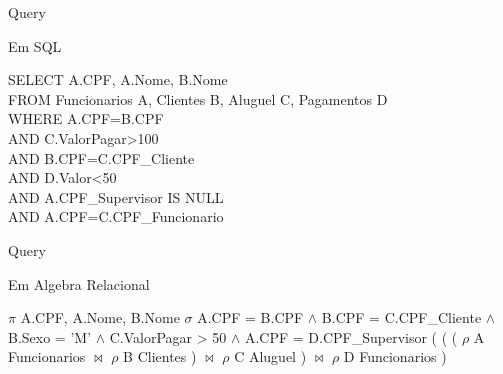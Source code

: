 \documentclass[aspectratio=169]{beamer}
\begin{document}
  \begin{frame}{Query}
   
      Em SQL
      
      \begin{flushleft}
        SELECT A.CPF, A.Nome, B.Nome \\
        FROM Funcionarios A, Clientes B, Aluguel C, Pagamentos D \\
        WHERE A.CPF=B.CPF \\
        AND C.ValorPagar>100 \\
        AND B.CPF=C.CPF\_Cliente \\
        AND D.Valor<50 \\
        AND A.CPF\_Supervisor IS NULL \\
        AND A.CPF=C.CPF\_Funcionario  \\
      \end{flushleft}

  \end{frame}
  \begin{frame}{Query}
  
    Em Algebra Relacional
    \begin{flushleft}
      $\pi$ A.CPF, A.Nome, B.Nome $\sigma$ A.CPF = B.CPF $\wedge$ B.CPF = C.CPF\_Cliente $\wedge$ B.Sexo = 'M' $\wedge$ C.ValorPagar > 50 $\wedge$ A.CPF = D.CPF\_Supervisor ( ( ( $\rho$ A Funcionarios $\bowtie$ $\rho$ B Clientes ) $\bowtie$ $\rho$ C Aluguel ) $\bowtie$ $\rho$ D Funcionarios ) 
    \end{flushleft}
  \end{frame}
\end{document}
